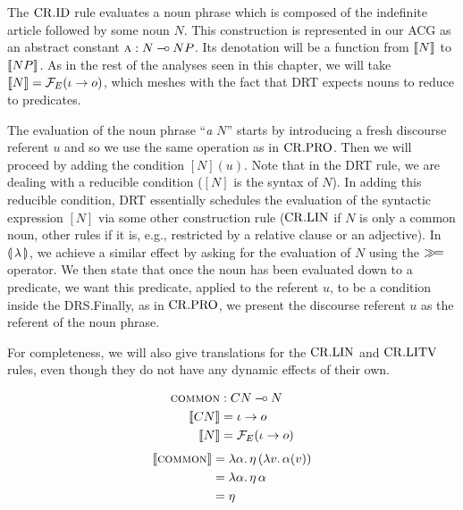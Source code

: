 \vspace{6mm}

The $\mathrm{CR.ID}$ rule evaluates a noun phrase which is composed of the
indefinite article followed by some noun $N$. This construction is
represented in our ACG as an abstract constant $\textsc{a} : N \mathbin{{-}\mkern-3.5mu{\circ}} NP$. Its
denotation will be a function from $\llbracket N \rrbracket$ to $\llbracket NP \rrbracket$. As in the rest
of the analyses seen in this chapter, we will take
$\llbracket N \rrbracket = \mathcal{F}_E(\iota \to o)$, which meshes with the fact that DRT expects
nouns to reduce to predicates.

The evaluation of the noun phrase ``\emph{a $N$}'' starts by introducing a
fresh discourse referent $u$ and so we use the same operation as in
$\mathrm{CR.PRO}$. Then we will proceed by adding the condition $[N](u)$. Note that
in the DRT rule, we are dealing with a reducible condition ($[N]$ is the
syntax of $N$). In adding this reducible condition, DRT essentially
schedules the evaluation of the syntactic expression $[N]$ via some other
construction rule ($\mathrm{CR.LIN}$ if $N$ is only a common noun, other rules if it
is, e.g., restricted by a relative clause or an adjective). In
$\llparenthesis \, \lambda \, \rrparenthesis$, we achieve a similar effect by asking for the
evaluation of $N$ using the $\mathbin{\gg\!=}$ operator. We then state that once the
noun has been evaluated down to a predicate, we want this predicate,
applied to the referent $u$, to be a condition inside the DRS.\@ Finally,
as in $\mathrm{CR.PRO}$, we present the discourse referent $u$ as the referent of
the noun phrase.

For completeness, we will also give translations for the $\mathrm{CR.LIN}$ and
$\mathrm{CR.LITV}$ rules, even though they do not have any dynamic effects of their
own.

\vspace{6mm}

\begin{minipage}{0.5\textwidth}
\crlinbox
\end{minipage}
\begin{minipage}{0.5\textwidth}
\begin{align*}
\textsc{common} &: CN \mathbin{{-}\mkern-3.5mu{\circ}} N \\
\llbracket CN \rrbracket &= \iota \to o \\
\llbracket N \rrbracket &= \mathcal{F}_E(\iota \to o)
\end{align*}
\begin{align*}
\llbracket \textsc{common} \rrbracket &= \lambda \alpha.\, \eta\,(\lambda v.\, \alpha(v)) \\
                   &= \lambda \alpha.\, \eta\,\alpha \\
                   &= \eta
\end{align*}
\end{minipage}

